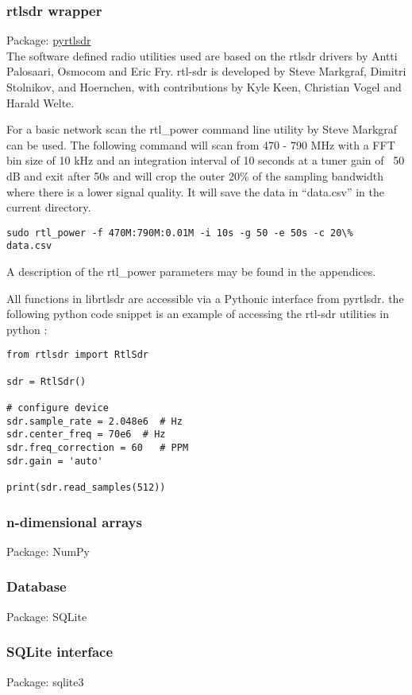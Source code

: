 \subsubsection{rtlsdr wrapper}
Package:	\href{https://github.com/roger-/pyrtlsdr}{pyrtlsdr}\\
The software defined radio utilities used are based on the rtlsdr drivers by Antti Palosaari, Osmocom and Eric Fry. rtl-sdr is developed by Steve Markgraf, Dimitri Stolnikov, and Hoernchen, with contributions by Kyle Keen, Christian Vogel and Harald Welte.

For a basic network scan the rtl\_power command line utility by Steve Markgraf can be used. The following command will scan from 470 - 790 MHz with a FFT bin size of 10 kHz and an integration interval of 10 seconds at a tuner gain of ~50 dB and exit after 50s and will crop the outer 20\% of the sampling bandwidth where there is a lower signal quality. It will save the data in “data.csv” in the current directory.
\begin{lstlisting}
sudo rtl_power -f 470M:790M:0.01M -i 10s -g 50 -e 50s -c 20\%  data.csv
\end{lstlisting}

A description of the rtl\_power parameters may be found in the appendices.

All functions in librtlsdr are accessible via a Pythonic interface from pyrtlsdr.
the following python code snippet is an example of accessing the rtl-sdr utilities in python :

\begin{lstlisting}
from rtlsdr import RtlSdr

sdr = RtlSdr()

# configure device
sdr.sample_rate = 2.048e6  # Hz
sdr.center_freq = 70e6 	# Hz
sdr.freq_correction = 60   # PPM
sdr.gain = 'auto'

print(sdr.read_samples(512))
\end{lstlisting}

\subsubsection{n-dimensional arrays}
Package:	NumPy

\subsubsection{Database}
Package:	SQLite

\subsubsection{SQLite interface}
Package:	sqlite3
    
    
    
    
    
    
    
    
    
    
    
    
    
    
    
    
    
    
    
    
    
    
    
    
    
    
    
  
  
  
  
  
  